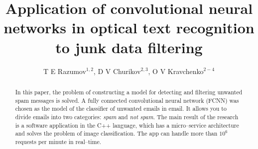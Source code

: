 \documentclass[12pt]{jpconf}
\begin{document}
\title{Application of convolutional neural networks in optical text recognition to junk data filtering}
\author{T E Razumov$^{1,2}$, D V Churikov$^{2,3}$, O V Kravchenko$^{2-4}$}

\address{
$^1$\,Mail.ru Group, Leningradsky pr., 39--79, Moscow, 125167, Russian Federation\\
$^2$\,Scientific and Technological Centre of Unique Instrumentation, Butlerova str., 15, Moscow, 117342, Russian Federation\\
$^3$\,Kotel'nikov Institute of Radio Engineering and Electronics of RAS, Mokhovaya st. 11--7,
Moscow, 125009, Russian Federation\\
$^4$\,Federal Research Center ``Computer Science and Control'' of RAS, Vavilova st., 40, Moscow, 119333, Russian Federation
}



\begin{abstract}
In this paper, the problem of constructing a model for detecting and filtering unwanted spam messages is solved. A fully connected convolutional neural network ({FCNN}) was chosen as the model of the classifier of unwanted emails in email. It allows you to divide emails into two categories: \emph{spam} and \emph{not spam}.
The main result of the research is a software application in the C++ language, which has a micro--service architecture and solves the problem of image classification. The app can handle more than $10^6$ requests per minute in real--time.
\end{abstract}

\end{document}

